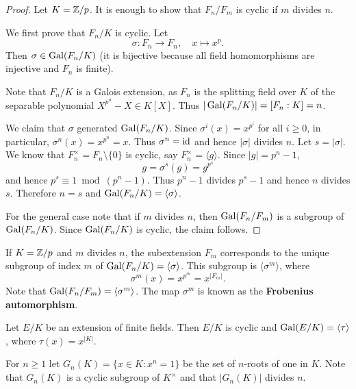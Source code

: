 \begin{proof}
    Let $K=\mathbb{Z}/p$. It is enough to show that $F_n/F_m$ is cyclic if $m$ divides $n$. 
    
    We first prove that $F_n/K$ is cyclic. 
    Let 
    \[
    \sigma\colon F_n\to F_n,\quad 
    x\mapsto x^p.
    \]
    Then 
    $\sigma\in\operatorname{Gal}(F_n/K)$ (it is bijective because all field homomorphisms 
    are injective and $F_n$ is finite). 

    Note that 
    $F_n/K$ is a Galois extension, as $F_n$ is the splitting
    field over $K$ 
    of the separable polynomial $X^{p^n}-X\in K[X]$. 
    Thus $|\operatorname{Gal}(F_n/K)|=[F_n:K]=n$. 
    
    We claim that $\sigma$ generated $\operatorname{Gal}(F_n/K)$. Since 
    $\sigma^i(x)=x^{p^i}$ for all $i\geq 0$, in particular, 
    $\sigma^n(x)=x^{p^n}=x$. Thus $\sigma^n=\operatorname{id}$ and hence $|\sigma|$ divides $n$. Let 
    $s=|\sigma|$. We know that $F_n^{\times}=F_n\setminus\{0\}$ is
    cyclic, say $F_n^{\times}=\langle g\rangle$. Since $|g|=p^n-1$, 
    \[
    g=\sigma^s(g)=g^{p^s}
    \]
    and hence $p^s\equiv 1\bmod (p^n-1)$. Thus $p^n-1$ divides $p^s-1$ and
    hence $n$ divides $s$. Therefore $n=s$ and $\operatorname{Gal}(F_n/K)=\langle\sigma\rangle$. 
    
    For the general case note that if $m$ divides $n$, 
    then $\operatorname{Gal}(F_n/F_m)$ is a subgroup of $\operatorname{Gal}(F_n/K)$. Since  $\operatorname{Gal}(F_n/K)$ is cyclic, 
    the claim follows.
\end{proof}

If $K=\mathbb{Z}/p$ and 
$m$ divides $n$, the subextension $F_m$ corresponds 
to the unique
subgroup of index $m$ of $\operatorname{Gal}(F_n/K)=\langle\sigma\rangle$. This subgroup
is $\langle\sigma^m\rangle$, where
\[
\sigma^m(x)=x^{p^m}=x^{|F_m|}.
\]
Note that $\operatorname{Gal}(F_n/F_m)=\langle\sigma^m\rangle$. 
The map $\sigma^m$ is known as 
the \textbf{Frobenius automorphism}. 

\begin{exercise}
    Let $E/K$ be an extension of finite fields. Then $E/K$ 
    is cyclic and $\operatorname{Gal}(E/K)=\langle\tau\rangle$, where $\tau(x)=x^{|K|}$. 
\end{exercise}





For $n\geq1$ let $G_n(K)=\{x\in K:x^n=1\}$ be the 
set of $n$-roots of one in $K$. Note that
$G_n(K)$ is a cyclic subgroup of $K^{\times}$ and that 
$|G_n(K)|$ divides $n$. 

